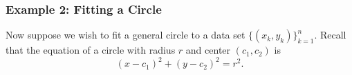 %
%


\subsubsection*{Example 2: Fitting a Circle}
Now suppose we wish to fit a general circle to a data set $\{(x_k, y_k)\}_{k=1}^n$. Recall that the equation of a circle with radius $r$ and center $(c_1,c_2)$ is
\begin{equation}
\label{circle}
(x-c_1)^2 + (y-c_2)^2 = r^2.
\end{equation}

